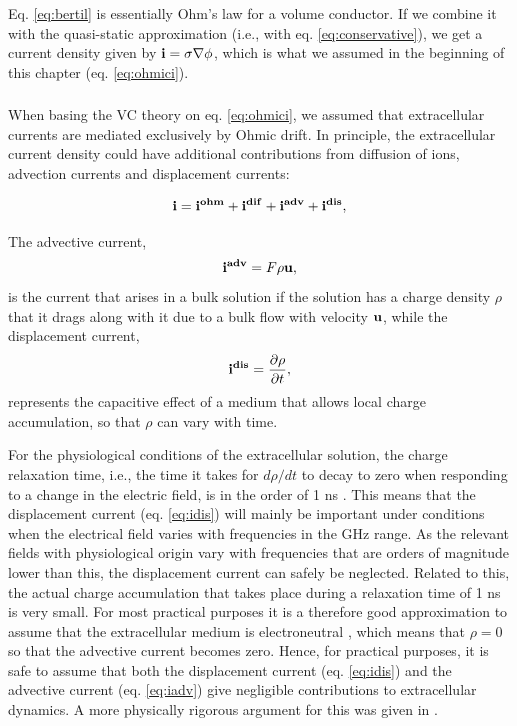 Eq. \ref{eq:bertil} is essentially Ohm's law for a volume conductor. If we combine it with the quasi-static approximation (i.e., with eq. \ref{eq:conservative}), we get a current density given by ${\bf i} = \sigma \nabla \phi$, which is what we assumed in the beginning of this chapter (eq. \ref{eq:ohmici}).


\subsubsection{}
\label{sec:onlyohmic}
When basing the VC theory on eq. \ref{eq:ohmici}, we assumed that extracellular currents are mediated exclusively by Ohmic drift. In principle, the extracellular current density could have additional contributions from diffusion of ions, advection currents and displacement currents:

\begin{equation}
{\bf i} = {\bf i^{ohm}} + {\bf i^{dif}} + {\bf i^{adv}} + {\bf i^{dis}}, 
\label{eq:generalcurrent}
\end{equation}

The advective current, 
\begin{equation}
{\bf i^{adv}} = F \rho {\bf u}, 
\label{eq:iadv}
\end{equation}
is the current that arises in a bulk solution if the solution has a charge density $\rho$ that it drags along with it due to a bulk flow with velocity ${\bf u}$, while the displacement current,
\begin{equation}
{\bf i^{dis}} = \frac{\partial \rho}{\partial t},
\label{eq:idis}
\end{equation}
represents the capacitive effect of a medium that allows local charge accumulation, so that $\rho$ can vary with time.  

For the physiological conditions of the extracellular solution, the charge relaxation time, i.e., the time it takes for $d\rho/dt$ to decay to zero when responding to a change in the electric field, is in the order of 1 ns \cite{Grodzinsky2011, Gratiy2017}. This means that the displacement current (eq. \ref{eq:idis}) will mainly be important under conditions when the electrical field varies with frequencies in the GHz range. As the relevant fields with physiological origin vary with frequencies that are orders of magnitude lower than this, the displacement current can safely be neglected. Related to this, the actual charge accumulation that takes place during a relaxation time of 1 ns is very small. For most practical purposes it is a therefore good approximation to assume that the extracellular medium is electroneutral \cite{Solbra2018}, which means that $\rho = 0$ so that the advective current becomes zero. Hence, for practical purposes, it is safe to assume that both the displacement current (eq. \ref{eq:idis}) and the advective current (eq. \ref{eq:iadv}) give negligible contributions to extracellular dynamics. A more physically rigorous argument for this was given in \cite{Gratiy2017}. 

